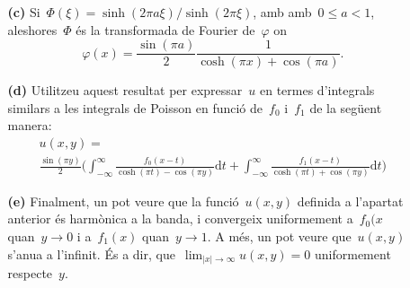 \documentclass[a4paper]{article}
\theoremstyle{plain}
\providecommand{\uppi}{\pi}
\newcommand{\diff}{\mathrm{d}}
\newcommand{\abs}[1]{\lvert{#1}\rvert}
\begin{document}
\begin{enumerate}
    \item[]\begin{enumerate}
        \item[\textbf{(c)}] Si~\(\Phi(\xi)=\sinh(2\uppi a\xi)/\sinh(2\uppi\xi)\), amb
            amb~\(0\leq a<1\), aleshores~\(\Phi\) és la transformada de Fourier
            de~\(\varphi\) on
            \[
                \varphi(x)
                = \frac{\sin(\uppi a)}{2}
                \frac{1}{\cosh(\uppi x) + \cos(\uppi a)}.
            \]
    \end{enumerate}
\end{enumerate}

\begin{enumerate}
    \item[]\begin{enumerate}
        \item[\textbf{(d)}] Utilitzeu aquest resultat per expressar~\(u\) en
            termes d'integrals similars a les integrals de Poisson en funció
            de~\(f_{0}\) i~\(f_{1}\) de la següent manera:
            \begin{multline*}
                u(x,y)
                = \\
                \frac{\sin(\uppi y)}{2}
                \biggl(
                    \int_{-\infty}^{\infty}
                    \frac{f_{0}(x-t)}{\cosh(\uppi t)-\cos(\uppi y)}
                    \diff t
                    +
                    \int_{-\infty}^{\infty}
                    \frac{f_{1}(x-t)}{\cosh(\uppi t)+\cos(\uppi y)}
                    \diff t
                \biggr)
            \end{multline*}
    \end{enumerate}
\end{enumerate}

\begin{enumerate}
    \item[]\begin{enumerate}
        \item[\textbf{(e)}] Finalment, un pot veure que la funció~\(u(x,y)\)
            definida a l'apartat anterior és harmònica a la banda, i convergeix
            uniformement a~\(f_{0}(x\) quan~\(y\to0\) i a~\(f_{1}(x)\)
            quan~\(y\to1\).
            A més, un pot veure que~\(u(x,y)\) s'anu{\lgem}a a l'infinit. És a
            dir, que~\(\lim_{\abs{x}\to\infty}u(x,y)=0\) uniformement
            respecte~\(y\).
    \end{enumerate}
\end{enumerate}
\end{document}
